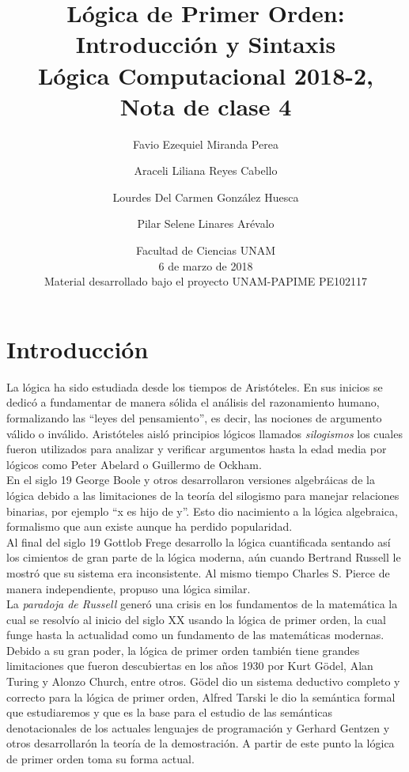 \documentclass[11pt,letterpaper]{article}
\title{Lógica de Primer Orden: Introducción y Sintaxis \\ 
L\'ogica Computacional 2018-2, Nota de clase 4}
\author{Favio Ezequiel Miranda Perea\and Araceli Liliana Reyes Cabello\and
Lourdes Del Carmen Gonz\'alez Huesca \and Pilar Selene Linares Ar\'evalo}
\date{Facultad de Ciencias UNAM \\ 6 de marzo de 2018 \\
Material desarrollado bajo el proyecto UNAM-PAPIME PE102117}
\begin{document}
\maketitle

\section{Introducción}

La lógica ha sido estudiada desde los tiempos de Aristóteles. En sus inicios
se dedicó a fundamentar de manera sólida el análisis del razonamiento
humano, formalizando las \enquote{leyes del pensamiento}, es decir, las 
nociones de argumento válido o inválido. 
Aristóteles aisló principios lógicos llamados
\emph{silogismos} los cuales fueron utilizados para analizar y verificar
argumentos hasta la edad media por lógicos como Peter Abelard o Guillermo de 
Ockham.\\

En el siglo 19 George Boole y otros desarrollaron versiones algebráicas de la
lógica debido a las limitaciones de la teoría del silogismo para manejar
relaciones binarias, por ejemplo \enquote{x es hijo de y}. 
Esto dio nacimiento a la lógica algebraica, formalismo que aun existe aunque ha 
perdido popularidad.\\

Al final del siglo 19 Gottlob Frege desarrollo la lógica cuantificada
sentando así los cimientos de gran parte de la lógica moderna, aún cuando
Bertrand Russell le mostró que su sistema era inconsistente. Al mismo tiempo
Charles S. Pierce de manera independiente, propuso una lógica similar.\\

La \emph{paradoja de Russell} generó una crisis en los fundamentos de la
matemática la cual se resolvío al inicio del siglo XX usando la lógica de
primer orden, la cual funge hasta la actualidad como un fundamento
de las matemáticas modernas.
Debido a su gran poder, la lógica de primer orden también tiene grandes
limitaciones que fueron descubiertas en los años 1930 por Kurt Gödel,
Alan Turing y Alonzo Church, entre otros. Gödel dio un sistema
deductivo completo y correcto para la lógica de primer orden, Alfred Tarski
le dio la semántica formal que estudiaremos y que es la base para el estudio
de las semánticas denotacionales de los actuales lenguajes de programación y
Gerhard Gentzen y otros desarrollarón la teoría de la demostración. A partir de
este punto la lógica de primer orden toma su forma actual.\\
\end{document}
